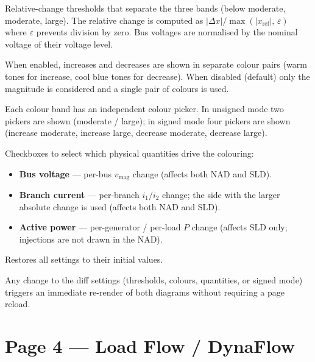 \documentclass[a4paper,11pt]{article}
\begin{document}
\begin{description}[leftmargin=2em]
  \item[\textbf{Moderate / Large threshold (\%)}] Relative-change thresholds
    that separate the three bands (below moderate, moderate, large). The
    relative change is computed as $|\Delta x| / \max(|x_{\mathrm{ref}}|,\,\varepsilon)$
    where $\varepsilon$ prevents division by zero. Bus voltages are normalised by
    the nominal voltage of their voltage level.
  \item[\textbf{Signed deviations}] When enabled, increases and decreases are
    shown in separate colour pairs (warm tones for increase, cool blue tones for
    decrease). When disabled (default) only the magnitude is considered and a
    single pair of colours is used.
  \item[\textbf{Colours}] Each colour band has an independent colour picker.
    In unsigned mode two pickers are shown (moderate / large); in signed mode
    four pickers are shown (increase moderate, increase large, decrease moderate,
    decrease large).
  \item[\textbf{Highlighted quantities}] Checkboxes to select which physical
    quantities drive the colouring:
    \begin{itemize}[leftmargin=1.5em]
      \item \textbf{Bus voltage} --- per-bus $v_{\mathrm{mag}}$ change (affects both
        NAD and SLD).
      \item \textbf{Branch current} --- per-branch $i_1 / i_2$ change; the side
        with the larger absolute change is used (affects both NAD and SLD).
      \item \textbf{Active power} --- per-generator / per-load $P$ change
        (affects SLD only; injections are not drawn in the NAD).
    \end{itemize}
  \item[\textbf{Reset to defaults}] Restores all settings to their initial
    values.
\end{description}

\begin{notebox}
Any change to the diff settings (thresholds, colours, quantities, or signed
mode) triggers an immediate re-render of both diagrams without requiring a page
reload.
\end{notebox}

\section{Page 4 --- Load Flow / DynaFlow}
\label{sec:loadflow}
\end{document}
